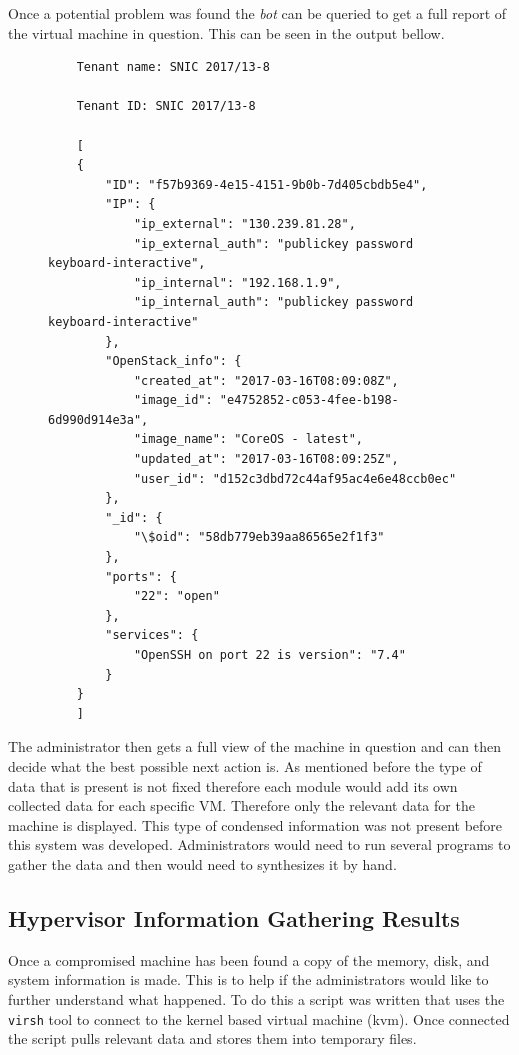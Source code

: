 \documentclass[12pt]{article}
\begin{document}
\newpage
Once a potential problem was found the \emph{bot} can be queried to get a full report of the virtual machine in question. This can be seen in the output bellow.

\begin{figure}[H]
\begin{mdframed}
\begin{lstlisting}
    Tenant name: SNIC 2017/13-8

    Tenant ID: SNIC 2017/13-8

    [
    {
        "ID": "f57b9369-4e15-4151-9b0b-7d405cbdb5e4",
        "IP": {
            "ip_external": "130.239.81.28",
            "ip_external_auth": "publickey password keyboard-interactive",
            "ip_internal": "192.168.1.9",
            "ip_internal_auth": "publickey password keyboard-interactive"
        },
        "OpenStack_info": {
            "created_at": "2017-03-16T08:09:08Z",
            "image_id": "e4752852-c053-4fee-b198-6d990d914e3a",
            "image_name": "CoreOS - latest",
            "updated_at": "2017-03-16T08:09:25Z",
            "user_id": "d152c3dbd72c44af95ac4e6e48ccb0ec"
        },
        "_id": {
            "\$oid": "58db779eb39aa86565e2f1f3"
        },
        "ports": {
            "22": "open"
        },
        "services": {
            "OpenSSH on port 22 is version": "7.4"
        }
    }
    ]
\end{lstlisting}
\end{mdframed}
\end{figure}

The administrator then gets a full view of the machine in question and can then decide what the best possible next action is. As mentioned before the type of data that is present is not fixed therefore each module would add its own collected data for each specific VM. Therefore only the relevant data for the machine is displayed. This type of condensed information was not present before this system was developed. Administrators would need to run several programs to gather the data and then would need to synthesizes it by hand.

\subsection{Hypervisor Information Gathering Results}
Once a compromised machine has been found a copy of the memory, disk, and system information is made. This is to help if the administrators would like to further understand what happened. To do this a script was written that uses the \lstinline{virsh} tool to connect to the kernel based virtual machine (kvm). Once connected the script pulls relevant data and stores them into temporary files.
\end{document}
